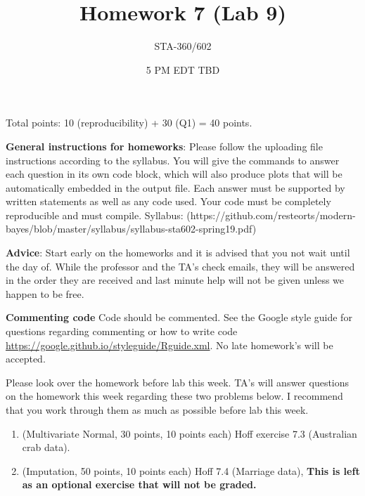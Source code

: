 \documentclass{article}
\begin{document}
\title{Homework 7 (Lab 9)}
\author{STA-360/602}
\date{5 PM EDT TBD}
\maketitle

Total points: 10 (reproducibility) + 30 (Q1) = 40 points. 

\textbf{General instructions for homeworks}: Please follow the uploading file instructions according to the syllabus. You will give the commands to answer each question in its own code block, which will also produce plots that will be automatically embedded in the output file. Each answer must be supported by written statements as well as any code used. Your code must be completely reproducible and must compile. Syllabus: (https://github.com/resteorts/modern-bayes/blob/master/syllabus/syllabus-sta602-spring19.pdf)

\textbf{Advice}: Start early on the homeworks and it is advised that you not wait until the day of. While the professor and the TA's check emails, they will be answered in the order they are received and last minute help will not be given unless we happen to be free.  

\textbf{Commenting code}
Code should be commented. See the Google style guide for questions regarding commenting or how to write 
code \url{https://google.github.io/styleguide/Rguide.xml}. No late homework's will be accepted.

Please look over the homework before lab this week. TA's will answer questions on the homework this week regarding these two 
problems below. I recommend that you work through them as much as possible before lab this week. 

\begin{enumerate}
\item (Multivariate Normal, 30 points, 10 points each) Hoff exercise 7.3 (Australian crab data).
\item (Imputation, 50 points, 10 points each) Hoff 7.4 (Marriage data), \textbf{This is left as an optional exercise that will not be graded.}
\end{enumerate}
\end{document}
